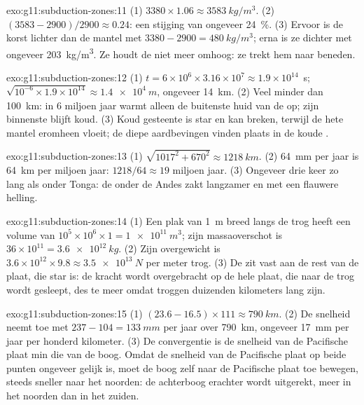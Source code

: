 \begin{solution}{exo:g11:subduction-zones:11}
(1) $3380 \times 1.06 \approx \qty{3583}{kg/m^3}$. (2)
$(3583 - 2900)/2900 \approx 0.24$: een stijging van ongeveer \qty{24}{\percent}.
(3) Ervoor is de korst lichter dan de mantel met
$3380 - 2900 = \qty{480}{kg/m^3}$; erna is ze dichter met ongeveer
\qty{203}{kg/m^3}. Ze houdt de  niet meer omhoog: ze trekt hem naar beneden.
\end{solution}

\begin{solution}{exo:g11:subduction-zones:12}
(1) $t = 6 \times 10^6 \times 3.16 \times 10^7 \approx 1.9 \times 10^{14}$~s;
$\sqrt{10^{-6} \times 1.9 \times 10^{14}} \approx \qty{1.4e4}{m}$, ongeveer
\qty{14}{km}. (2) Veel minder dan \qty{100}{km}: in 6 miljoen jaar warmt alleen de
buitenste huid van de  op; zijn binnenste blijft koud. (3) Koud gesteente is
star en kan breken, terwijl de hete mantel eromheen vloeit; de diepe
aardbevingen vinden plaats in de koude .
\end{solution}

\begin{solution}{exo:g11:subduction-zones:13}
(1) $\sqrt{1017^2 + 670^2} \approx \qty{1218}{km}$. (2) \qty{64}{mm} per jaar
is \qty{64}{km} per miljoen jaar: $1218/64 \approx 19$ miljoen jaar.
(3) Ongeveer drie keer zo lang als onder Tonga: de  onder de Andes
zakt langzamer en met een flauwere helling.
\end{solution}

\begin{solution}{exo:g11:subduction-zones:14}
(1) Een plak van \qty{1}{m} breed langs de trog heeft een volume van
$10^5 \times 10^6 \times 1 = \qty{1e11}{m^3}$; zijn massaoverschot is
$36 \times 10^{11} = \qty{3.6e12}{kg}$. (2) Zijn overgewicht is
$3.6 \times 10^{12} \times 9.8 \approx \qty{3.5e13}{N}$ per meter
trog. (3) De  zit vast aan de rest van de plaat, die star is:
de kracht wordt overgebracht op de hele plaat, die naar de trog wordt
gesleept, des te meer omdat troggen duizenden kilometers lang zijn.
\end{solution}

\begin{solution}{exo:g11:subduction-zones:15}
(1) $(23.6 - 16.5) \times 111 \approx \qty{790}{km}$. (2) De snelheid neemt toe met
$237 - 104 = \qty{133}{mm}$ per jaar over \qty{790}{km}, ongeveer \qty{17}{mm} per
jaar per honderd kilometer. (3) De convergentie is de snelheid van de
Pacifische plaat min die van de boog. Omdat de snelheid van de Pacifische plaat op
beide punten ongeveer gelijk is, moet de boog zelf naar de
Pacifische plaat toe bewegen, steeds sneller naar het noorden: de achterboog erachter wordt
uitgerekt, meer in het noorden dan in het zuiden.
\end{solution}

